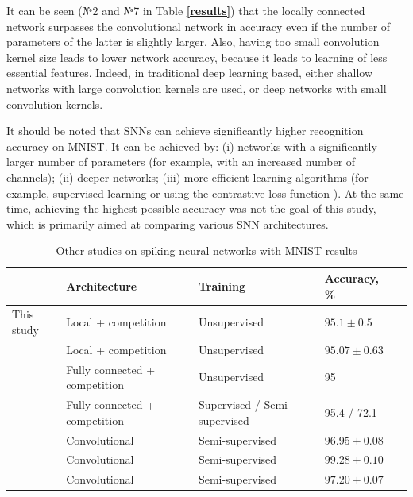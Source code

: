 \documentclass[a4paper,10pt]{article}
\newcommand{\refbf}[1]{\textbf{\ref{#1}}}
\begin{document}
It can be seen (№2 and №7 in Table \refbf{results}) that the locally connected network surpasses the convolutional network in accuracy even if the number of parameters of the latter is slightly larger. Also, having too small convolution kernel size leads to lower network accuracy, because it leads to learning of less essential features. Indeed, in traditional deep learning based, either shallow networks with large convolution kernels are used, or deep networks with small convolution kernels.

It should be noted that SNNs can achieve significantly higher recognition accuracy on MNIST. It can be achieved by: (i) networks with a significantly larger number of parameters (for example, with an increased number of channels); (ii) deeper networks; (iii) more efficient learning algorithms (for example, supervised learning or using the contrastive loss function \parencite{contrastive_loss}). At the same time, achieving the highest possible accuracy was not the goal of this study, which is primarily aimed at comparing various SNN architectures.

\begin{table}[H]
 \caption{Other studies on spiking neural networks with MNIST results}
\begin{center}
\begin{tabular}{|l|P{2.8cm}|P{2.5cm}|l|l|}
\hline
{} & Architecture & Training & Accuracy, \% \\
\hline\hline
{This study} & {Local + competition} & {Unsupervised} & {$95.1 \pm 0.5$}\\
\hline\hline
{\parencite{saunders2019locally}} & {Local + competition} & {Unsupervised} & {$95.07 \pm 0.63$}\\
\hline
{\parencite{mnist2}} & {Fully connected + \linebreak competition} & {Unsupervised} & {95}\\
\hline
{\parencite{MaxActiv1}} & {Fully connected + \linebreak competition} & {Supervised / \linebreak Semi-supervised} & {95.4 / 72.1}\\
\hline
{\parencite{conv1}} & {Convolutional} & {Semi-supervised} & {$96.95 \pm 0.08$}\\
\hline
{\parencite{conv2}} & {Convolutional} & {Semi-supervised} & {$99.28 \pm 0.10$}\\
\hline
{\parencite{conv3}} & {Convolutional} & {Semi-supervised} & {$97.20 \pm 0.07$}\\
\hline
\end{tabular}
\end{center}
\end{table}
\end{document}
